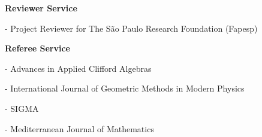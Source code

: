 \documentclass[10pt]{article}
\newenvironment{innerlist}[1][\enskip\textbullet]%
        {\begin{compactitem}[#1]}{\end{compactitem}}
\newcommand{\blankline}{\quad\pagebreak[2]}
\begin{document}
   \blankline
   
   \textbf{Reviewer Service}
   \begin{innerlist}   
\item[]- Project Reviewer for The São Paulo Research Foundation (Fapesp)
   \end{innerlist}
	 
	 \blankline
	 
	 \textbf{Referee Service}
		\begin{innerlist}
   \item[]- Advances in Applied Clifford Algebras
\item[]- International Journal of Geometric Methods in Modern Physics
\item[]- SIGMA
\item[]- Mediterranean Journal of Mathematics
		\end{innerlist}
				

\end{document}
